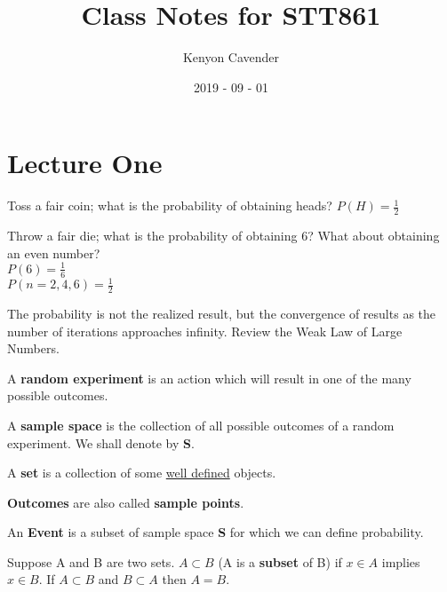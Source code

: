 \documentclass[12pt, oneside, letterpaper]{notes}
\begin{document}
\title{Class Notes for STT861}
\author{Kenyon Cavender}
\date{2019 - 09 - 01}
\maketitle

\section{Lecture One}

\begin{myex}
  Toss a fair coin; what is the probability of obtaining heads? 
  $P(H) = \frac{1}{2}$
\end{myex}

\begin{myex}
  Throw a fair die; what is the probability of obtaining 6?  
  What about obtaining an even number? \\
\indent$P(6) = \frac{1}{6}$ \\
\indent$P(n = 2,4,6) = \frac{1}{2}$ 
\end{myex}

\noindent The probability is not the realized result, but the 
  convergence of results as the number of iterations approaches 
  infinity.  Review the Weak Law of Large Numbers.

\begin{mydef}
  A \textbf{random experiment} is an action which will result 
  in one of the many possible outcomes. 
\end{mydef}

\begin{mydef}
  A \textbf{sample space} is the collection of all possible 
  outcomes of a random experiment.  We shall denote by \textbf{S}.
\end{mydef}

\begin{mydef}
  A \textbf{set} is a collection of some \underline{well defined} 
  objects.
\end{mydef}

\begin{mydef}
  \textbf{Outcomes} are also called \textbf{sample points}.
\end{mydef}

\begin{mydef}
  An \textbf{Event} is a subset of sample space \textbf{S} for 
  which we can define probability.
\end{mydef}

\begin{mydef}
  Suppose A and B are two sets.  $A \subset B$ (A is a 
  \textbf{subset} of B) if $x \in A$ implies $x \in B$. 
  If $A \subset B$ and $B \subset A$ then $A=B$.
\end{mydef}
\end{document}
